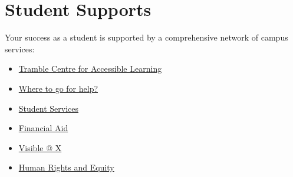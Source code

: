 \documentclass[12pt]{article}
\begin{document}
\begin{stfxevaluation}







\end{stfxevaluation}

\section*{Student Supports}

Your success as a student is supported by a comprehensive network of campus services:

\begin{itemize}
  \item \href{https://www.stfx.ca/student-services/academic-services/accessible-learning}{Tramble Centre for Accessible Learning}
  \item \href{https://www.stfx.ca/programs-courses/stfx-online/student-support}{Where to go for help?}
  \item \href{https://www.stfx.ca/student-life-support/student-services-department}{Student Services}
  \item \href{https://www.stfx.ca/applications-admissions/financial-support/financial-aid-office}{Financial Aid}
  \item \href{https://www.stfx.ca/student-services/support-services/visible-at-x}{Visible @ X}
  \item \href{https://www.stfx.ca/student-services/support-services/human-rights-equity}{Human Rights and Equity}
\end{itemize}
\end{document}
